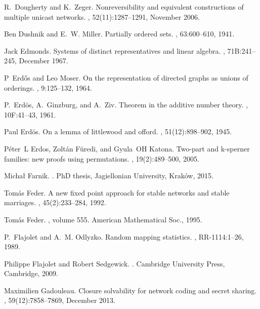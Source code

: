 \documentclass[a4paper, 11pt]{book}
\numberwithin{equation}{section}
\theoremstyle{plain}
\renewcommand{\(}{\ldbrack}
\renewcommand{\)}{\rdbrack}
\begin{document}
\begin{thebibliography}{100}
R.~Dougherty and K.~Zeger.
\newblock Nonreversibility and equivalent constructions of multiple unicast
  networks.
, 52(11):1287--1291,
  November 2006.

Ben Dushnik and E.~W. Miller.
\newblock Partially ordered sets.
, 63:600--610, 1941.

Jack Edmonds.
\newblock Systems of distinct representatives and linear algebra.
,
  71B:241--245, December 1967.

P~Erd\H{o}s and Leo Moser.
\newblock On the representation of directed graphs as unions of orderings.
, 9:125--132, 1964.

P.~Erd\"os, A.~Ginzburg, and A.~Ziv.
\newblock Theorem in the additive number theory.
, 10F:41--43, 1961.

Paul Erd{\"o}s.
\newblock On a lemma of littlewood and offord.
, 51(12):898--902,
  1945.

P{\'e}ter~L Erdos, Zolt{\'a}n F{\"u}redi, and Gyula~OH Katona.
\newblock Two-part and k-sperner families: new proofs using permutations.
, 19(2):489--500, 2005.

Micha\l{} Farnik.
.
\newblock PhD thesis, Jagiellonian University, Krak\'ow, 2015.

Tom{\'a}s Feder.
\newblock A new fixed point approach for stable networks and stable marriages.
, 45(2):233--284, 1992.

Tom{\'a}s Feder.
, volume 555.
\newblock American Mathematical Soc., 1995.

P.~Flajolet and A.~M. Odlyzko.
\newblock Random mapping statistics.
, RR-1114:1--26, 1989.

Philippe Flajolet and Robert Sedgewick.
.
\newblock Cambridge University Press, Cambridge, 2009.

Maximilien Gadouleau.
\newblock Closure solvability for network coding and secret sharing.
, 59(12):7858--7869,
  December 2013.


\end{thebibliography}
\end{document}
